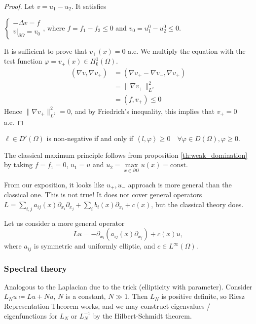 \documentclass{report}
\begin{document}
\begin{proof}
    Let \(v = u_{1} - u_{2}\). It satisfies

    \(\begin{cases}
        -\Delta v = f \\
        \left. v \right|_{\partial \Omega} = v_{0}
    \end{cases}\), where \(f = f_{1} - f_{2} \leq 0\) and \(v_0 = u_{1}^{0} - u_{2}^{0} \leq 0\).

    It is sufficient to prove that \(v_{+}(x) = 0\) a.e. We multiply the equation with the test function \(\varphi = v_{+}(x) \in H^{1}_{0}(\Omega)\).
    \begin{align*}
        (\nabla v, \nabla v_{+}) &= (\nabla v_{+} - \nabla v_{-}, \nabla v_{+}) \\
        &= \|\nabla v_{+}\|_{L^{2}}^{2} \\
        &= (f, v_{+}) \leq 0
    \end{align*}
    Hence \(\|\nabla v_{+}\|_{L^{2}}^{2} = 0\), and by Friedrich's inequality, this implies that \(v_{+} = 0\) a.e.
\end{proof}

\begin{note}
    \(\ell \in D'(\Omega)\) is non-negative if and only if \(\left\langle l, \varphi \right\rangle \geq 0 \quad \forall \varphi \in D(\Omega), \varphi \geq 0\).
\end{note}

\begin{corollary}{}{}
    The classical maximum principle follows from proposition \ref{th:weak_domination} by taking \(f = f_{1} = 0\), \(u_{1} = u\) and \(u_{2} = \max\limits_{x \in \partial \Omega} u(x) = \text{const}\).
\end{corollary}

\begin{note}
    From our exposition, it looks like \(u_{+}, u_{-}\) approach is more general than the classical one. This is not true! It does not cover general operators \(L = \sum_{i, j}a_{ij}(x)\partial_{x_{i}}\partial_{x_{j}} + \sum_{i}b_{i}(x)\partial_{x_{i}} + c(x)\), but the classical theory does. 
\end{note}

Let us consider a more general operator
\[
    Lu = -\partial_{x_{i}}(a_{ij}(x)\partial_{x_{j}}) + c(x)u,
\]
where $a_{ij}$ is symmetric and uniformly elliptic, and \(c \in L^{\infty}(\Omega)\).

\subsubsection*{Spectral theory}
Analogous to the Laplacian due to the trick (ellipticity with parameter). Consider \(L_{N}u \coloneqq  Lu + Nu\), \(N\) is a constant, \(N \gg 1\). Then \(L_{N}\) is positive definite, so Riesz Representation Theorem works, and we may construct eigenvalues / eigenfunctions for \(L_{N}\) or \(L_{N}^{-1}\) by the Hilbert-Schmidt theorem. \\
\end{document}
